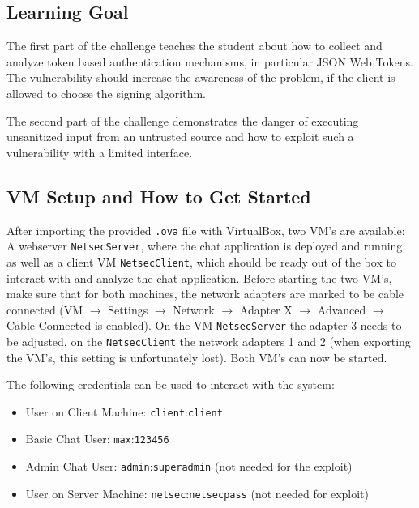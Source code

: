 \documentclass[12pt,a4paper]{article}
\newcommand{\code}[1]{\texttt{#1}}
\begin{document}
\subsection{Learning Goal}

The first part of the challenge teaches the student about how to collect and analyze token based authentication mechanisms, in particular JSON Web Tokens. The vulnerability should increase the awareness of the problem, if the client is allowed to choose the signing algorithm.

The second part of the challenge demonstrates the danger of executing unsanitized input from an untrusted source and how to exploit such a vulnerability with a limited interface.

\subsection{VM Setup and How to Get Started}
After importing the provided \code{.ova} file with VirtualBox, two VM's are available: A webserver \code{NetsecServer}, where the chat application is deployed and running, as well as a client VM \code{NetsecClient}, which should be ready out of the box to interact with and analyze the chat application. Before starting the two VM's, make sure that for both machines, the network adapters are marked to be cable connected (VM $\rightarrow$ Settings $\rightarrow$ Network $\rightarrow$ Adapter X $\rightarrow$ Advanced $\rightarrow$ Cable Connected is enabled). On the VM \code{NetsecServer} the adapter 3 needs to be adjusted, on the \code{NetsecClient} the network adapters 1 and 2 (when exporting the VM's, this setting is unfortunately lost). Both VM's can now be started.

The following credentials can be used to interact with the system:
\begin{itemize}
	\item User on Client Machine: \code{client}:\code{client}
	\item Basic Chat User: \code{max}:\code{123456}
	\item Admin Chat User: \code{admin}:\code{superadmin} (not needed for the exploit)
	\item User on Server Machine: \code{netsec}:\code{netsecpass} (not needed for exploit)
\end{itemize}
\end{document}
